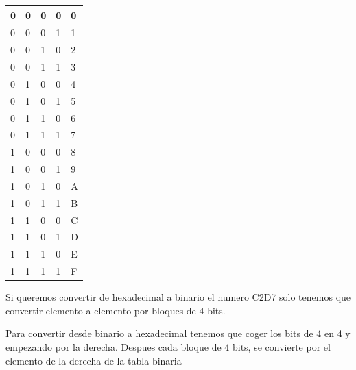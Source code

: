 \documentclass[a4paper,english]{article}
\newlength{\DUtablewidth} %
\begin{document}
\leavevmode
\setlength{\DUtablewidth}{\linewidth}
\begin{longtable}[c]{|p{0.075\DUtablewidth}|p{0.075\DUtablewidth}|p{0.075\DUtablewidth}|p{0.075\DUtablewidth}|p{0.075\DUtablewidth}|}
\hline

0
 & 
0
 & 
0
 & 
0
 & 
0
 \\
\hline

0
 & 
0
 & 
0
 & 
1
 & 
1
 \\
\hline

0
 & 
0
 & 
1
 & 
0
 & 
2
 \\
\hline

0
 & 
0
 & 
1
 & 
1
 & 
3
 \\
\hline

0
 & 
1
 & 
0
 & 
0
 & 
4
 \\
\hline

0
 & 
1
 & 
0
 & 
1
 & 
5
 \\
\hline

0
 & 
1
 & 
1
 & 
0
 & 
6
 \\
\hline

0
 & 
1
 & 
1
 & 
1
 & 
7
 \\
\hline

1
 & 
0
 & 
0
 & 
0
 & 
8
 \\
\hline

1
 & 
0
 & 
0
 & 
1
 & 
9
 \\
\hline

1
 & 
0
 & 
1
 & 
0
 & 
A
 \\
\hline

1
 & 
0
 & 
1
 & 
1
 & 
B
 \\
\hline

1
 & 
1
 & 
0
 & 
0
 & 
C
 \\
\hline

1
 & 
1
 & 
0
 & 
1
 & 
D
 \\
\hline

1
 & 
1
 & 
1
 & 
0
 & 
E
 \\
\hline

1
 & 
1
 & 
1
 & 
1
 & 
F
 \\
\hline
\end{longtable}

Si queremos convertir de hexadecimal a binario el numero C2D7 solo tenemos que convertir elemento a elemento por bloques de 4 bits.

Para convertir desde binario a hexadecimal tenemos que coger los bits de 4 en 4 y empezando por la derecha. Despues cada bloque de 4 bits, se convierte por el elemento de la derecha de la tabla binaria
\end{document}
